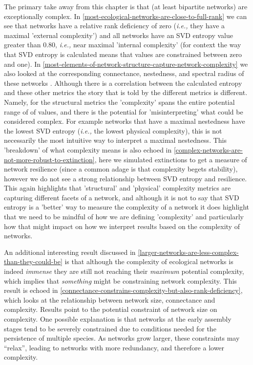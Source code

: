 The primary take away from this chapter is that (at least bipartite networks) are exceptionally complex. In \autoref{most-ecological-networks-are-close-to-full-rank} we can see that networks have a relative rank deficiency of zero (\emph{i.e.,} they have a maximal 'external complexity') and all networks have an SVD entropy value greater than 0.80, \emph{i.e.,} near maximal 'internal complexity' (for context the way that SVD entropy is calculated means that values are constrained between zero and one). In \autoref{most-elements-of-network-structure-capture-network-complexity} we also looked at the corresponding connectance, nestedness, and spectral radius of these networks . Although there is a correlation between the calculated entropy and these other metrics the story that is told by the different metrics is different. Namely, for the structural metrics the 'complexity' spans the entire potential range of of values, and there is the potential for 'misinterpreting' what could be considered complex. For example networks that have a maximal nestedness have the lowest SVD entropy (\emph{i.e.,} the lowest physical complexity), this is not necessarily the most intuitive way to interpret a maximal nestedness. This 'breakdown' of what complexity means is also echoed in \autoref{complex-networks-are-not-more-robust-to-extinction}, here we simulated extinctions to get a measure of network resilience (since a common adage is that complexity begets stability), however we do not see a strong relationship between SVD entropy and resilience. This again highlights that 'structural' and 'physical' complexity metrics are capturing different facets of a network, and although it is not to say that SVD entropy is a 'better' way to measure the complexity of a network it does highlight that we need to be mindful of how we are defining 'complexity' and particularly how that might impact on how we interpret results based on the complexity of networks.

An additional interesting result discussed in \autoref{larger-networks-are-less-complex-than-they-could-be} is that although the complexity of ecological networks is indeed \emph{immense} they are still not reaching their \emph{maximum} potential complexity, which implies that \emph{something} might be constraining network complexity. This result is echoed in \autoref{connectance-constrains-complexity-but-also-rank-deficiency}, which looks at the relationship between network size, connectance and complexity. Results point to the potential constraint of network size on complexity. One possible explanation is that networks at the early assembly stages tend to be severely constrained \cite{Barbier2018GenAss, Saravia2018EcoNet} due to conditions needed for the persistence of multiple species. As networks grow larger, these constraints may ``relax'', leading to networks with more redundancy, and therefore a lower complexity.

